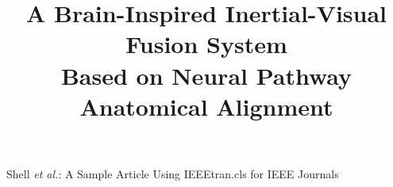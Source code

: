 \documentclass[lettersize,journal]{IEEEtran}
\begin{document}
\title{A Brain-Inspired Inertial-Visual Fusion System\\Based on Neural Pathway Anatomical Alignment}


%
{Shell \MakeLowercase{\textit{et al.}}: A Sample Article Using IEEEtran.cls for IEEE Journals}


\maketitle












\end{document}
